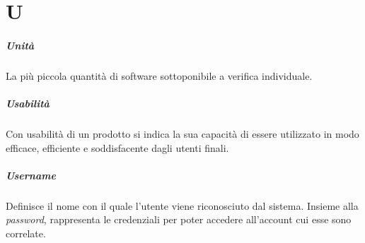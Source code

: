 \chapter{U}

\paragraph*{Unità}
La più piccola quantità di software sottoponibile a verifica individuale.

\paragraph*{Usabilità}
Con usabilità di un prodotto si indica la sua capacità di essere utilizzato in modo efficace, efficiente e
soddisfacente dagli utenti finali.


\paragraph*{Username}
Definisce il nome con il quale l'utente viene riconosciuto dal sistema. Insieme alla \textit{password}, rappresenta le credenziali per poter accedere all'account cui esse sono correlate.
